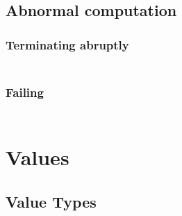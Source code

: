 \subsection*{Abnormal computation}\hypertarget{abnormal-computation}{}\label{abnormal-computation}

\subsubsection*{Terminating abruptly}\hypertarget{terminating-abruptly}{}\label{terminating-abruptly}

\begin{align*}
  [ ~ 
  \KEY{Entity} ~ & \NAMEHYPER{../../../../../Funcons-beta/Computations/Abnormal}{Abrupting}{abrupted} \\
  \KEY{Funcon} ~ & \NAMEHYPER{../../../../../Funcons-beta/Computations/Abnormal}{Abrupting}{handle-abrupt}
  ~ ]
\end{align*}
\subsubsection*{Failing}\hypertarget{failing}{}\label{failing}

\begin{align*}
  [ ~ 
  \KEY{Funcon} ~ & \NAMEHYPER{../../../../../Funcons-beta/Computations/Abnormal}{Failing}{finalise-failing} \\
  \KEY{Funcon} ~ & \NAMEHYPER{../../../../../Funcons-beta/Computations/Abnormal}{Failing}{fail} \\
  \KEY{Funcon} ~ & \NAMEHYPER{../../../../../Funcons-beta/Computations/Abnormal}{Failing}{else} \\
  \KEY{Funcon} ~ & \NAMEHYPER{../../../../../Funcons-beta/Computations/Abnormal}{Failing}{checked} \\
  \KEY{Funcon} ~ & \NAMEHYPER{../../../../../Funcons-beta/Computations/Abnormal}{Failing}{check-true}
  ~ ]
\end{align*}
\section*{Values}\hypertarget{values}{}\label{values}

\subsection*{Value Types}\hypertarget{value-types}{}\label{value-types}

